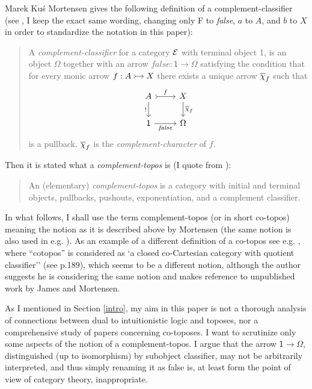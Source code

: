 \begin{artengenv}{Marek Ku\'s}
Mortensen gives the following definition of a complement-classifier (see \parencite[p.104f]{mortensen-1995}, I keep the exact same wording, changing only F to \textit{false}, $ a $ to $ A $, and $ b $ to $ X $ in order to standardize the notation in this paper):
\begin{quotation}
	A \textit{complement-classifier} for a category $  \mathcal{E} $ with terminal object \textsf{1}, is an object $\Omega$ together with an arrow $ \textit{false}: \textsf{1} \to \Omega $ satisfying the condition that for every monic arrow $\begin{tikzcd}[cramped, sep=small] f: A \ar[r, tail]  & X \end{tikzcd}$ there exists a unique arrow $ \overline{\chi}_f$ such that
	\begin{equation*}%
	\begin{tikzcd} 
	A \arrow[r, "f", tail] \arrow[d,"!"']    & X \arrow[d, "\ochi_f"] \\
	\textsf{1} \arrow[r, "\textit{false}"'] & \Omega
	\end{tikzcd}
	\end{equation*}
	is a pullback. $ \overline{\chi}_f $ is the \textit{complement-character} of $ f $.
\end{quotation}


Then it is stated what a \textit{complement-topos} is (I quote from \parencite[p.105]{mortensen-1995}):
\begin{quotation}
	An (elementary) \textit{complement-topos} is a category with initial and terminal objects, pullbacks, pushouts, exponentiation, and a complement classifier.
\end{quotation}

In what follows, I shall use the term complement-topos (or in short co-topos) meaning the notion as it is described above by Mortensen (the same notion is also used in e.g. \parencite{estrada-gonzalez-2010, estrada-gonzalez-2015}). As an example of a different definition of a co-topos see e.g. \parencite{angot-pellissier}, where ``cotopos'' is considered as `a closed co-Cartesian category with quotient classifier'' (see p.189), which seems to be a different notion, although the author suggests he is considering the same notion and makes reference to unpublished work by James and Mortensen.

As I mentioned in Section \ref{intro}, my aim in this paper is not a thorough analysis of connections between dual to intuitionistic logic and toposes, nor a comprehensive study of papers concerning co-toposes. I want to scrutinize only some aspects of the notion of a com\-ple\-ment-topos. I argue that the arrow $ \textsf{1} \to \Omega $, distinguished (up to isomorphism) by subobject classifier, may not be arbitrarily interpreted, and thus simply renaming it as false is, at least form the point of view of category theory, inappropriate.



\end{artengenv}
